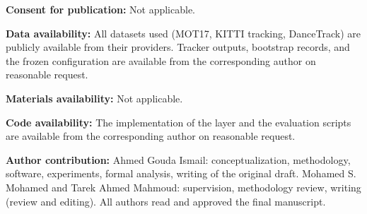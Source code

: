 \documentclass[pdflatex,sn-mathphys-num,iicol]{sn-jnl}
\begin{document}
\noindent\textbf{Consent for publication:} Not applicable.

\noindent\textbf{Data availability:} All datasets used (MOT17, KITTI tracking, DanceTrack) are publicly available from their providers. Tracker outputs, bootstrap records, and the frozen configuration are available from the corresponding author on reasonable request.

\noindent\textbf{Materials availability:} Not applicable.

\noindent\textbf{Code availability:} The implementation of the layer and the evaluation scripts are available from the corresponding author on reasonable request.

\noindent\textbf{Author contribution:} Ahmed Gouda Ismail: conceptualization, methodology, software, experiments, formal analysis, writing of the original draft. Mohamed S. Mohamed and Tarek Ahmed Mahmoud: supervision, methodology review, writing (review and editing). All authors read and approved the final manuscript.


\end{document}
